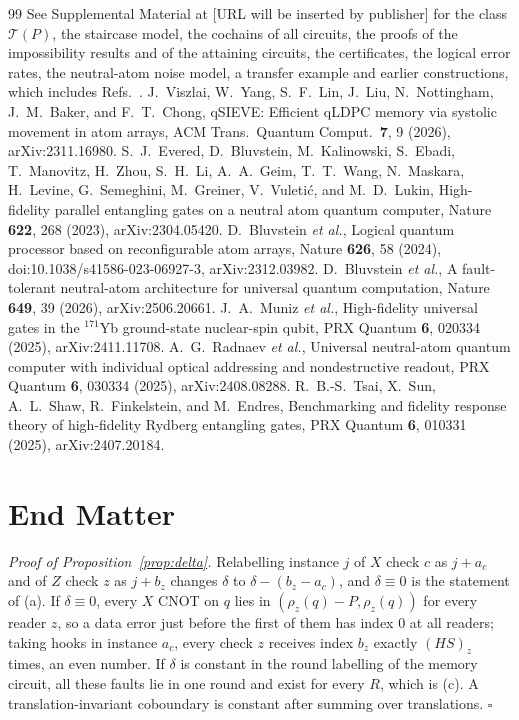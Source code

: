 \documentclass[aps,prl,twocolumn,superscriptaddress,nofootinbib]{revtex4-2}
\newcommand{\T}{\mathcal{T}}
\begin{document}
\begin{thebibliography}{99}
 See Supplemental Material at [URL will be inserted by publisher] for the
class $\T(P)$, the staircase model, the cochains of all circuits, the proofs of the
impossibility results and of the attaining circuits, the certificates, the logical error
rates, the neutral-atom noise model, a transfer example and earlier constructions, which
includes Refs.~\cite{Bravyi2024,Strikis2026,Xu2023,Gidney2021honeycomb,Gidney2021stim,CaDiCaL2024,DRATtrim2014,Bogaerts2023,GochtNordstrom2021,Tan2021cakelpr,Viszlai2026,Evered2023,Bluvstein2024,Bluvstein2025,Muniz2024,Radnaev2025,Tsai2025}.
 J.~Viszlai, W.~Yang, S.~F.~Lin, J.~Liu, N.~Nottingham,
J.~M.~Baker, and F.~T.~Chong, qSIEVE: Efficient qLDPC memory via systolic movement in
atom arrays, ACM Trans.\ Quantum Comput.\ \textbf{7}, 9 (2026), arXiv:2311.16980.
 S.~J.~Evered, D.~Bluvstein, M.~Kalinowski, S.~Ebadi, T.~Manovitz,
H.~Zhou, S.~H.~Li, A.~A.~Geim, T.~T.~Wang, N.~Maskara, H.~Levine, G.~Semeghini,
M.~Greiner, V.~Vuleti\'c, and M.~D.~Lukin, High-fidelity parallel entangling gates on a
neutral atom quantum computer, Nature \textbf{622}, 268 (2023), arXiv:2304.05420.
 D.~Bluvstein \emph{et al.}, Logical quantum processor based on
reconfigurable atom arrays, Nature \textbf{626}, 58 (2024),
doi:10.1038/s41586-023-06927-3, arXiv:2312.03982.
 D.~Bluvstein \emph{et al.}, A fault-tolerant neutral-atom
architecture for universal quantum computation, Nature \textbf{649}, 39 (2026),
arXiv:2506.20661.
 J.~A.~Muniz \emph{et al.}, High-fidelity universal gates in the
$^{171}$Yb ground-state nuclear-spin qubit, PRX Quantum \textbf{6}, 020334 (2025),
arXiv:2411.11708.
 A.~G.~Radnaev \emph{et al.}, Universal neutral-atom quantum
computer with individual optical addressing and nondestructive readout, PRX Quantum
\textbf{6}, 030334 (2025), arXiv:2408.08288.
 R.~B.-S.~Tsai, X.~Sun, A.~L.~Shaw, R.~Finkelstein, and M.~Endres,
Benchmarking and fidelity response theory of high-fidelity Rydberg entangling gates,
PRX Quantum \textbf{6}, 010331 (2025), arXiv:2407.20184.
\end{thebibliography}

\section*{End Matter}

\emph{Proof of Proposition~\ref{prop:delta}.} Relabelling instance $j$ of $X$ check $c$ as
$j+a_c$ and of $Z$ check $z$ as $j+b_z$ changes $\delta$ to $\delta-(b_z-a_c)$, and
$\delta\equiv0$ is the statement of (a). If $\delta\equiv0$, every $X$ CNOT on $q$ lies in
$(\rho_z(q)-P,\rho_z(q))$ for every reader $z$, so a data error just before the first of them
has index 0 at all readers; taking hooks in instance $a_c$, every check $z$ receives index
$b_z$ exactly $(HS)_z$ times, an even number. If $\delta$ is constant in the round labelling
of the memory circuit, all these faults lie in one round and exist for every $R$, which is
(c). A translation-invariant coboundary is constant after summing over translations.
$\square$
\end{document}

